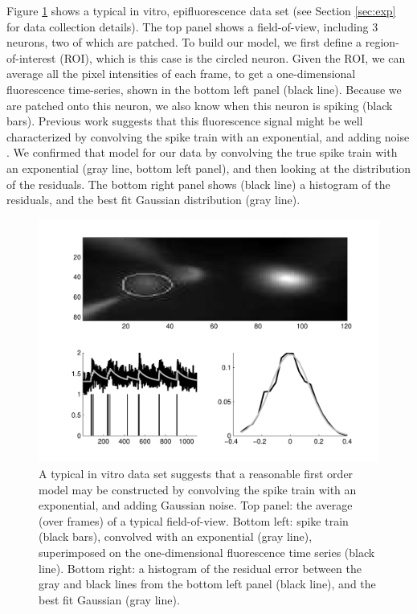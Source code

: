 Figure \ref{fig:in_vitro_ex} shows a typical in vitro, epifluorescence data set (see Section \ref{sec:exp} for data collection details).  The top panel shows a field-of-view, including 3 neurons, two of which are patched.  To build our model, we first define a region-of-interest (ROI),  which is this case is the circled neuron.  Given the ROI, we can average all the pixel intensities of each frame, to get a one-dimensional fluorescence time-series, shown in the bottom left panel (black line).  Because we are patched onto this neuron, we also know when this neuron is spiking (black bars). 
Previous work suggests that this fluorescence signal might be well characterized by convolving the spike train with an exponential, and adding noise \cite{YusteKonnerth06}.  We confirmed that model for our data by convolving the true spike train with an exponential (gray line, bottom left panel), and then looking at the distribution of the residuals.  The bottom right panel shows (black line) a histogram of the residuals, and the best fit Gaussian distribution (gray line).


\begin{figure}[H]
\centering \includegraphics[width=.9\linewidth]{../figs/in_vitro_ex}
\caption{A typical in vitro data set suggests that a reasonable first order model may be constructed by convolving the spike train with an exponential, and adding Gaussian noise. Top panel: the average (over frames) of a typical field-of-view.  Bottom left: spike train (black bars), convolved with an exponential (gray line), superimposed on the one-dimensional fluorescence time series (black line).  Bottom right: a histogram of the residual error between the gray and black lines from the bottom left panel (black line), and the best fit Gaussian (gray line).} \label{fig:in_vitro_ex}
\end{figure}

